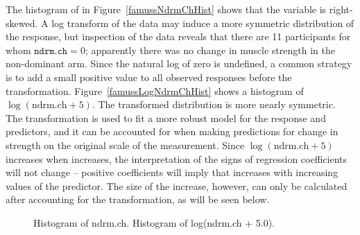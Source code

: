 The histogram of  in Figure~\ref{famussNdrmChHist} shows that the variable is right-skewed.  A log transform of the data may induce a more symmetric distribution of the response, but inspection of the data reveals that there are 11 participants for whom $\texttt{ndrm.ch} = 0$; apparently there was no change in muscle strength in the non-dominant arm.   Since the natural log of zero is undefined, a common strategy is to add a small positive value to all observed responses before the transformation.  Figure~\ref{famussLogNdrmChHist} shows a histogram of $\log(\text{ndrm.ch} + 5)$. The transformed distribution is more nearly symmetric.  The transformation is used to fit a more robust model for the response and predictors, and it can be accounted for when making predictions for change in strength on the original scale of the measurement. Since $\log(\text{ndrm.ch} + 5)$ increases when  increases, the interpretation of the signs of regression coefficients will not change -- positive coefficients will imply that  increases with increasing values of the predictor.  The size of the increase, however, can only be calculated after accounting for the transformation, as will be seen below.



\begin{figure}[ht]
	\centering
	\caption{ Histogram of ndrm.ch.  Histogram of log(ndrm.ch + 5.0).}
	\label{famussNdrmChHistograms}
\end{figure}


